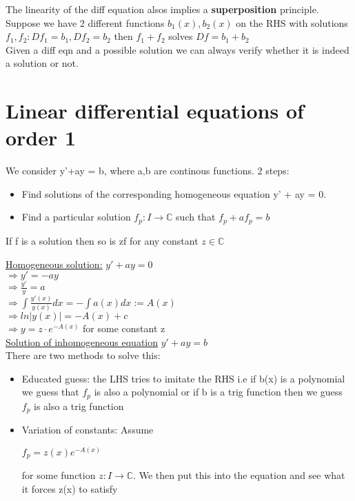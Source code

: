 \documentclass[8pt]{extreport}
\begin{document}
The linearity of the diff equation alsos implies a \textbf{superposition} principle. Suppose we have 2 different functions $b_1(x), b_2(x)$ on the RHS with solutions $f_1,f_2: Df_1 = b_1, Df_2 =b_2$ then $f_1 + f_2$ solves $Df = b_1+b_2$ \\

Given a diff eqn and a possible solution we can always verify whether it is indeed a solution or not. 

\section{Linear differential equations of order 1}

We consider y'+ay = b, where a,b are continous functions. 2 steps:
\begin{itemize}
\item Find solutions of the corresponding homogeneous equation y' + ay = 0.
\item Find a particular solution $f_p:I \rightarrow \mathbb{C}$ such that $f_p + a f_p = b$ 
\end{itemize}

If f is a solution then so is zf for any constant $z \in \mathbb{C}$

\underline{Homogeneous solution:}
$y' + ay = 0$\\
$\Rightarrow y' = -ay$\\
$\Rightarrow \frac{y'}{y} = a$\\
$\Rightarrow \int \frac{y'(x)}{y(x)}dx = -\int a(x) dx := A(x)$\\
$\Rightarrow ln|y(x)| = -A(x) +c$\\
$\Rightarrow y = z\cdot e^{-A(x)}$ for some constant z\\

\underline{Solution of inhomogeneous equation}
$y' + ay = b$\\
There are two methods to solve this:
\begin{itemize}
\item Educated guess: the LHS tries to imitate the RHS i.e if b(x) is a polynomial we guess that $f_p$ is also a polynomial or if b is a trig function then we guess $f_p$ is also a trig function
\item Variation of constants: Assume
\begin{center}
$ f_p = z(x)e^{-A(x)}$ 
\end{center}
for some function $z:I \rightarrow \mathbb{C}$. We then put this into the equation and see what it forces z(x) to satisfy
\end{itemize} 
\end{document}
